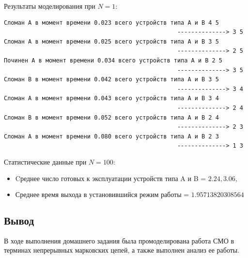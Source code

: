 Результаты моделирования при $N=1$:
\scriptsize
\begin{verbatim}
Сломан A в момент времени 0.023 всего устройств типа А и В 4 5
                                                  --------------> 3 5
Сломан A в момент времени 0.025 всего устройств типа А и В 3 5
                                                  --------------> 2 5
Починен A в момент времени 0.034 всего устройств типа А и В 2 5
                                                  --------------> 3 5
Сломан B в момент времени 0.042 всего устройств типа А и В 3 5
                                                  --------------> 3 4
Сломан A в момент времени 0.043 всего устройств типа А и В 3 4
                                                  --------------> 2 4
Сломан B в момент времени 0.052 всего устройств типа А и В 2 4
                                                  --------------> 2 3
Сломан A в момент времени 0.080 всего устройств типа А и В 2 3
                                                  --------------> 1 3

\end{verbatim}
\normalsize

Статистические данные при $N=100$:
\begin{itemize}
    \item Cреднее число готовых к эксплуатации устройств типа A и B = $ 2.24, 3.06 $,
    \item Среднее время выхода в установившийся режим работы = $ 1.95713820308564 $
\end{itemize}
\subsection{Вывод}
В ходе выполнения домашнего задания была промоделирована работа СМО в терминах непрерывных марковских цепей,
а также выполнен анализ ее работы.

